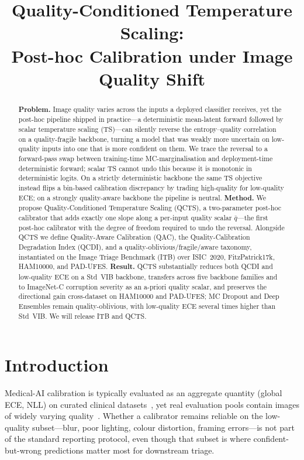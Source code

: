 \documentclass{bmvc2k}
\title{Quality-Conditioned Temperature Scaling:\\
       Post-hoc Calibration under Image Quality Shift}
\begin{document}
\maketitle
\begin{abstract}
\textbf{Problem.} Image quality varies across the inputs a deployed classifier receives, yet the post-hoc pipeline shipped in practice---a deterministic mean-latent forward followed by scalar temperature scaling (TS)---can silently reverse the entropy--quality correlation on a quality-fragile backbone, turning a model that was weakly more uncertain on low-quality inputs into one that is more confident on them. We trace the reversal to a forward-pass swap between training-time MC-marginalisation and deployment-time deterministic forward; scalar TS cannot undo this because it is monotonic in deterministic logits. On a strictly deterministic backbone the same TS objective instead flips a bin-based calibration discrepancy by trading high-quality for low-quality ECE; on a strongly quality-aware backbone the pipeline is neutral.
\textbf{Method.} We propose Quality-Conditioned Temperature Scaling (QCTS), a two-parameter post-hoc calibrator that adds exactly one slope along a per-input quality scalar $\bar q$---the first post-hoc calibrator with the degree of freedom required to undo the reversal. Alongside QCTS we define Quality-Aware Calibration (QAC), the Quality-Calibration Degradation Index (QCDI), and a quality-oblivious/fragile/aware taxonomy, instantiated on the Image Triage Benchmark (ITB) over ISIC~2020, FitzPatrick17k, HAM10000, and PAD-UFES.
\textbf{Result.} QCTS substantially reduces both QCDI and low-quality ECE on a Std~VIB backbone, transfers across five backbone families and to ImageNet-C corruption severity as an a-priori quality scalar, and preserves the directional gain cross-dataset on HAM10000 and PAD-UFES; MC Dropout and Deep Ensembles remain quality-oblivious, with low-quality ECE several times higher than Std~VIB. We will release ITB and QCTS.
\end{abstract}

\section{Introduction}

Medical-AI calibration is typically evaluated as an aggregate quantity (global ECE, NLL) on curated clinical datasets~\cite{codella2018skin,tschandl2019ham10000,guo2017calibration}, yet real evaluation pools contain images of widely varying quality~\cite{esteva2017dermatologist,tschandl2020human}. Whether a calibrator remains reliable on the low-quality subset---blur, poor lighting, colour distortion, framing errors---is not part of the standard reporting protocol, even though that subset is where confident-but-wrong predictions matter most for downstream triage.
\end{document}
